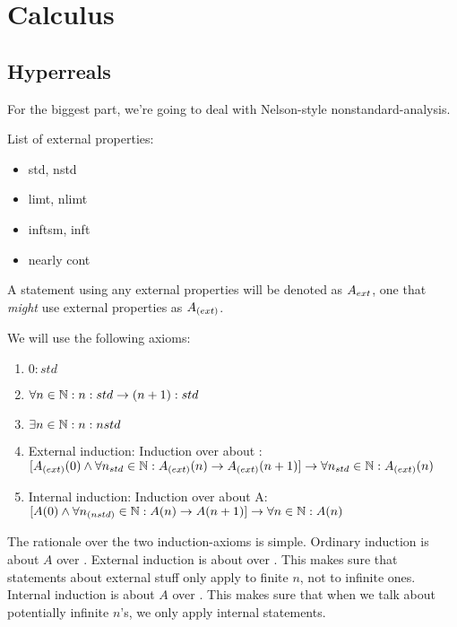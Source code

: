 \section{Calculus}

\subsection{Hyperreals}

For the biggest part, we're going to deal with Nelson-style nonstandard-analysis. 

List of external properties:
\begin{itemize}
    \item std, nstd
    \item limt, nlimt
    \item inftsm, inft
    \item nearly cont
\end{itemize}

A statement using any external properties will be denoted as $A_{ext}$, one that \emph{might} use external properties as $A_{(ext)}$.

We will use the following axioms:
\begin{enumerate}
    \item $0:std$
    \item $\forall n \in \mathbb{N}: n:std \to (n+1):std $
    \item $\exists n \in \mathbb{N}: n:nstd $
    \item External induction: Induction  over  about : \\ 
    $ [ A_{(ext)}(0) \land \forall n_{std} \in \mathbb{N}: A_{(ext)}(n) \to A_{(ext)}(n+1) ] \to \forall n_{std} \in \mathbb{N}: A_{(ext)}(n)$
    \item Internal induction: Induction over  about A: \\
    $ [A(0) \land \forall n_{(nstd)} \in \mathbb{N}: A(n) \to A(n+1)] \to \forall n \in \mathbb{N}: A(n) $
\end{enumerate}

The rationale over the two induction-axioms is simple. Ordinary induction is about $A$ over . 
External induction is about  over . This makes sure that statements about external stuff only apply to finite $n$, not to infinite ones. 
Internal induction is about $A$ over . This makes sure that when we talk about potentially infinite $n$'s, we only apply internal statements.

